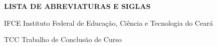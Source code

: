 \vfill
\begin{center}
{\textbf{LISTA DE ABREVIATURAS E SIGLAS}}
\end{center}
\vspace{0.5cm}

\begin{siglas}
\item[IFCE] Instituto Federal de Educação, Ciência e Tecnologia do Ceará
\item[TCC] Trabalho de Conclusão de Curso
\end{siglas}
